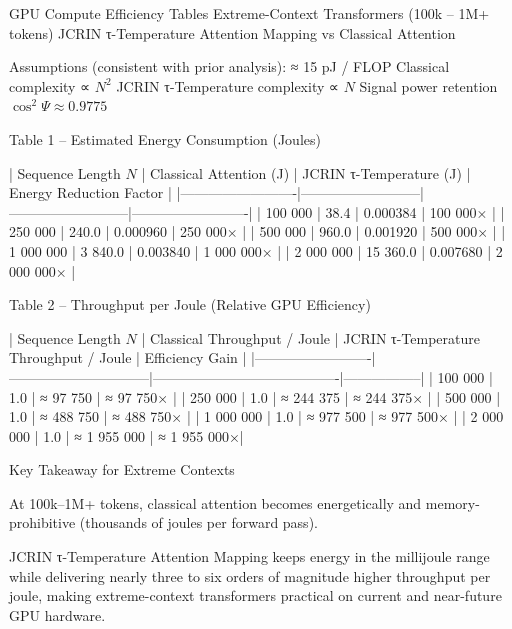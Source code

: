 GPU Compute Efficiency Tables  
Extreme-Context Transformers (100k – 1M+ tokens)  
JCRIN τ-Temperature Attention Mapping vs Classical Attention

Assumptions (consistent with prior analysis):
≈ 15 pJ / FLOP
Classical complexity ∝ \( N^2 \)
JCRIN τ-Temperature complexity ∝ \( N \)
Signal power retention \( \cos^2\Psi \approx 0.9775 \)

Table 1 – Estimated Energy Consumption (Joules)

| Sequence Length \( N \) | Classical Attention (J) | JCRIN τ-Temperature (J) | Energy Reduction Factor |
|-------------------------|--------------------------|--------------------------|-------------------------|
| 100 000                 | 38.4                     | 0.000384                 | 100 000×            |
| 250 000                 | 240.0                    | 0.000960                 | 250 000×            |
| 500 000                 | 960.0                    | 0.001920                 | 500 000×            |
| 1 000 000               | 3 840.0                  | 0.003840                 | 1 000 000×          |
| 2 000 000               | 15 360.0                 | 0.007680                 | 2 000 000×          |

Table 2 – Throughput per Joule (Relative GPU Efficiency)

| Sequence Length \( N \) | Classical Throughput / Joule | JCRIN τ-Temperature Throughput / Joule | Efficiency Gain |
|-------------------------|------------------------------|----------------------------------------|-----------------|
| 100 000                 | 1.0                          | ≈ 97 750                               | ≈ 97 750×   |
| 250 000                 | 1.0                          | ≈ 244 375                              | ≈ 244 375×  |
| 500 000                 | 1.0                          | ≈ 488 750                              | ≈ 488 750×  |
| 1 000 000               | 1.0                          | ≈ 977 500                              | ≈ 977 500×  |
| 2 000 000               | 1.0                          | ≈ 1 955 000                            | ≈ 1 955 000×|

Key Takeaway for Extreme Contexts

At 100k–1M+ tokens, classical attention becomes energetically and memory-prohibitive (thousands of joules per forward pass).  

JCRIN τ-Temperature Attention Mapping keeps energy in the millijoule range while delivering nearly three to six orders of magnitude higher throughput per joule, making extreme-context transformers practical on current and near-future GPU hardware.


